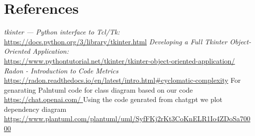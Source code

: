 \documentclass[11pt]{article}
\begin{document}
\section{References}

\normalsize{\textit{tkinter — Python interface to Tcl/Tk: }}\\
\hyperlink{https://docs.python.org/3/library/tkinter.html}{https://docs.python.org/3/library/tkinter.html}
\newline
\newline
\normalsize{\textit{Developing a Full Tkinter Object-Oriented Application: }}\\
\hyperlink{https://www.pythontutorial.net/tkinter/tkinter-object-oriented-application/}{https://www.pythontutorial.net/tkinter/tkinter-object-oriented-application/}
\newline
\newline
\normalsize{\textit{Radon - Introduction to Code Metrics}}\\
\hyperlink{https://radon.readthedocs.io/en/latest/intro.html#cyclomatic-complexity}{https://radon.readthedocs.io/en/latest/intro.html#cyclomatic-complexity}
\newline
\newline
\normalsize{For genarating Palntuml code for class diagram based on our code}
\hyperlink{https://chat.openai.com/ }{https://chat.openai.com/ } 
\newline
\newline
\normalsize{Using the code genrated from chatgpt we plot dependency diagram}
\hyperlink{https://www.plantuml.com/plantuml/uml/SyfFKj2rKt3CoKnELR1Io4ZDoSa70000}{https://www.plantuml.com/plantuml/uml/SyfFKj2rKt3CoKnELR1Io4ZDoSa70000}



\vspace{\baselineskip}
\end{document}
